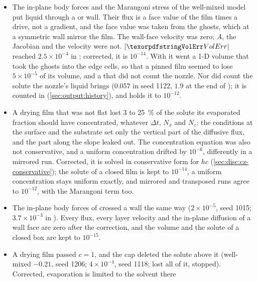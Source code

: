 \begin{itemize}
  \item The in-plane body forces and the Marangoni stress of the well-mixed
    model put liquid through a  or  wall.
    Their flux is a face value of the film times a drive, not a gradient, and
    the face value was taken from the ghosts, which at a symmetric wall
    mirror the film. The wall-face velocity was zero; $A$, the Jacobian and
    the velocity were not. $|\code{VolErr}|$ reached $2.5\times10^{-4}$ in
    ; corrected, it is $10^{-14}$. With it went a 1-D volume
    that took the ghosts into the edge cells, so that a pinned film seemed to
    lose $5\times10^{-5}$ of its volume, and a  that did not
    count the nozzle. Nor did  count the solute the
    nozzle's liquid brings ($0.057$ in seed 1122, $1.9$ at the end of
    ); it is counted in 
    (\cref{sec:output:history}), and  holds it
    to $10^{-12}$.
  \item A drying  film that was not flat lost 3 to
    \SI{25}{\percent} of the solute its evaporated fraction should have
    concentrated, whatever $\Delta t$, $N_x$ and $N_z$: the conditions at the
    surface and the substrate set only the vertical part of the diffusive
    flux, and the part along the slope leaked out. The concentration
    equation was also not conservative, and a uniform concentration drifted
    by $10^{-6}$, differently in a mirrored run. Corrected, it is solved in
    conservative form for $hc$ (\cref{sec:disc:cz-conservative}); the solute
    of a closed film is kept to $10^{-14}$, a uniform concentration stays
    uniform exactly, and mirrored and transposed runs agree to $10^{-12}$,
    with the Marangoni term too.
  \item The in-plane body forces of  crossed a 
    wall the same way ($2\times10^{-5}$, seed 1015; $3.7\times10^{-3}$ in
    ). Every flux, every layer velocity and the
    in-plane diffusion of a wall face are zero after the correction, and the
    volume and the
    solute of a closed box are kept to $10^{-15}$.
  \item A drying film passed $c = 1$, and the cap deleted the solute above it
    (well-mixed  $-0.21$, seed 1206; 
    $4\times10^{-4}$, seed 1118;  lost all of it,
     stopped). Corrected, evaporation is limited to the solvent there

\end{itemize}
